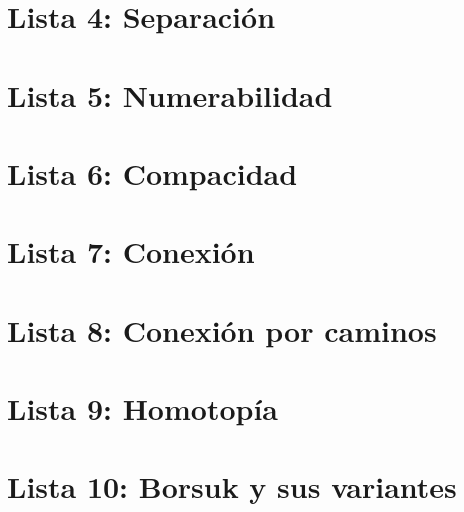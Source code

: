 \documentclass[10pt,a4paper,openright]{book}
\theoremstyle{break}
\begin{document}
\chapter{Lista 4: Separación}%
\label{cha:lista4}

\chapter{Lista 5: Numerabilidad}%
\label{cha:lista5}

\chapter{Lista 6: Compacidad}%
\label{cha:lista6}

\chapter{Lista 7: Conexión}%
\label{cha:lista7}

\chapter{Lista 8: Conexión por caminos}%
\label{cha:lista8}

\chapter{Lista 9: Homotopía}%
\label{cha:lista9}

\chapter{Lista 10: Borsuk y sus variantes}%
\label{cha:lista10}
\end{document}
